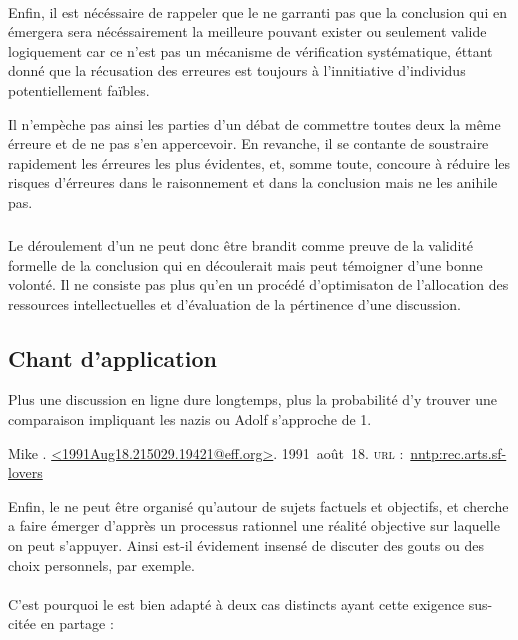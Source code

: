 \paragraph{}
Enfin, il est nécéssaire de rappeler que le \mainabbr{} ne garranti pas que la conclusion qui en émergera sera nécéssairement la meilleure pouvant exister ou seulement valide logiquement car ce n’est pas un mécanisme de vérification systématique, éttant donné que la récusation des erreures est toujours à l’innitiative d’individus potentiellement faïbles.

Il n’empèche pas ainsi les parties d’un débat de commettre toutes deux la même érreure et de ne pas s’en appercevoir. En revanche, il se contante de soustraire rapidement les érreures les plus évidentes, et, somme toute, concoure à réduire les risques d’érreures dans le raisonnement et dans la conclusion mais ne les anihile pas.

\subparagraph{}
Le déroulement d’un \mainabbr{} ne peut donc être brandit comme preuve de la validité formelle de la conclusion qui en découlerait mais peut témoigner d’une bonne volonté. Il ne consiste pas plus qu’en un procédé d’optimisaton de l’allocation des ressources intellectuelles et d’évaluation de la pértinence d’une discussion.

\subsection{Chant d’application}
\epigraph{Plus une discussion en ligne dure longtemps, plus la probabilité d’y trouver une comparaison impliquant les nazis ou Adolf  s’approche de 1.}{Mike . \url{<1991Aug18.215029.19421@eff.org>}. 1991~août~18. \textsc{url :}~\url{nntp:rec.arts.sf-lovers}}
Enfin, le \mainabbr{} ne peut être organisé qu’autour de sujets factuels et objectifs, et cherche a faire émerger d’apprès un processus rationnel une réalité objective sur laquelle on peut s’appuyer. Ainsi est-il évidement insensé de discuter des gouts ou des choix personnels, par exemple.

\paragraph*{}
C’est pourquoi le \mainabbr{} est bien adapté à deux cas distincts ayant cette exigence sus-citée en partage :

